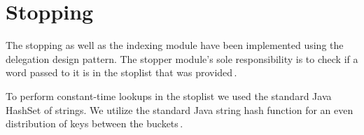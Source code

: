 
\section{Stopping}
\label{sec:stopping}

The stopping as well as the indexing module have been implemented using the delegation design pattern. The stopper module's sole responsibility is to check if a word passed to it is in the stoplist that was provided\,\cite{princeton}.

To perform constant-time lookups in the stoplist we used the standard Java HashSet of strings. We utilize the standard Java string hash function for an even distribution of keys between the buckets\,\cite{javamex}.